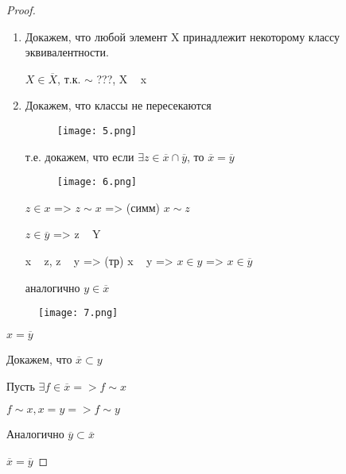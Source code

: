 \begin{proof}
    \begin{enumerate}
        \item Докажем, что любой элемент X принадлежит некоторому классу эквивалентности.

        $X \in \overline X$, т.к. $\sim$ ???, X ~ x

        \item Докажем, что классы не пересекаются
        
        \begin{figure}[H]
            \centering
            \texttt{[image: 5.png]}
            
            
            \label{fig:5}
        \end{figure}

        т.е. докажем, что если $\exists z \in \overline x \cap \overline y$, то $\overline x = \overline y$

        \begin{figure}[H]
            \centering
            \texttt{[image: 6.png]}
            
            
            \label{fig:6}
        \end{figure}

        $z \in x$ => $z \sim x$ => (симм) $x \sim z$

        $z \in \overline y$ => z ~ Y

        x ~ z, z ~ y => (тр) x ~ y => $x \in y$ => $x \in \overline y$

        аналогично $y \in \overline x$
    \end{enumerate}
    
    \begin{figure}[H]
        \centering
        \texttt{[image: 7.png]}
        
        
        \label{fig:7}
    \end{figure}

    $x = \overline y$

    Докажем, что $ \overline x \subset y$

    Пусть $\exists f \in \overline x => f \sim x$

    $f \sim x, x = y => f \sim y$

    Аналогично $\overline y \subset \overline x$

    $\overline x = \overline y$
\end{proof}

